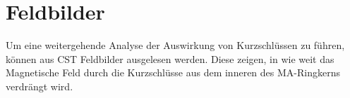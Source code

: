 \section{Feldbilder}
Um eine weitergehende Analyse der Auswirkung von Kurzschl\"ussen zu f\"uhren, k\"onnen aus CST Feldbilder ausgelesen werden. Diese zeigen, in wie weit das Magnetische Feld durch die Kurzschl\"usse aus dem inneren des MA-Ringkerns verdr\"angt wird. 